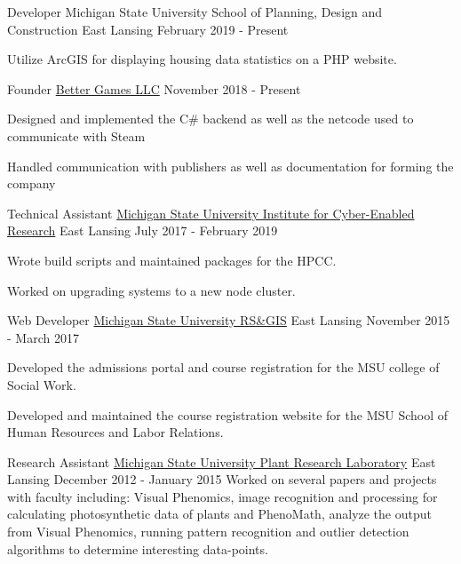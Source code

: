 
\begin{cventries}
  \cventry
  {Developer}
  {Michigan State University School of Planning, Design and Construction}
  {East Lansing}
  {February 2019 - Present}
  {
    \begin{cvitems}
      \item {Utilize ArcGIS for displaying housing data statistics on a PHP website.}
    \end{cvitems}
  }

  \cventry
    {Founder} %
    {\href{https://better-games.org}{Better Games LLC}} %
    {} %
    {November 2018 - Present} %
    {
        \begin{cvitems}
          \item {Designed and implemented the C\# backend as well as the netcode used to communicate with Steam}
          \item {Handled communication with publishers as well as documentation for forming the company}
        \end{cvitems}
    }

  \cventry
    {Technical Assistant}
    {\href{https://icer.msu.edu}{Michigan State University Institute for Cyber-Enabled Research}}
    {East Lansing}
    {July 2017 - February 2019}
    {
      \begin{cvitems}
        \item {Wrote build scripts and maintained packages for the HPCC.}
        \item {Worked on upgrading systems to a new node cluster.}
      \end{cvitems}
    }

  \cventry
    {Web Developer}
    {\href{http://www.rsgis.msu.edu}{Michigan State University RS\&GIS}}
    {East Lansing}
    {November 2015 - March 2017}
    {
      \begin{cvitems}
        \item {Developed the admissions portal and course registration for the MSU college of Social Work.}
        \item {Developed and maintained the course registration website for the MSU School of Human Resources and Labor Relations.}
      \end{cvitems}
    }

  \cventry
    {Research Assistant}
    {\href{https://prl.natsci.msu.edu/research-tech/center-for-advanced-algal-and-plant-phenotyping}{Michigan State University Plant Research Laboratory}}
    {East Lansing}
    {December 2012 - January 2015}
    {
      {Worked on several papers and projects with faculty including: Visual Phenomics, image recognition
      and processing for calculating photosynthetic data of plants and PhenoMath, analyze the output from Visual Phenomics,
      running pattern recognition and outlier detection algorithms to determine interesting data-points. }
    }
\end{cventries}
